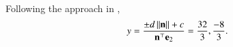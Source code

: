 Following the approach in ,
\begin{align}
		y = \frac{\pm d\left\lVert\mathbf{n}\right\rVert+c}{\mathbf{n}^\top\mathbf{e}_{2}}
= \frac{32}{3}, \frac{-8}{3}.
\end{align}

